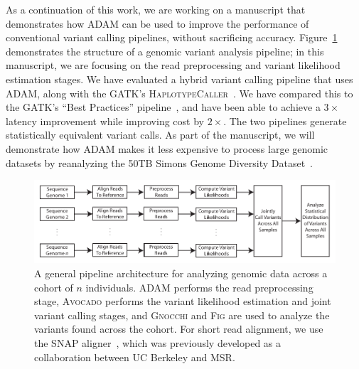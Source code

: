 \documentclass[11pt]{article} %
\begin{document}
As a continuation of this work, we are working on a manuscript that demonstrates how \textsc{ADAM}
can be used to improve the performance of conventional variant calling pipelines, without
sacrificing accuracy. Figure~\ref{fig:pipeline} demonstrates the structure of a genomic variant
analysis pipeline; in this manuscript, we are focusing on the read preprocessing and variant
likelihood estimation stages. We have evaluated a hybrid variant calling pipeline that
uses \textsc{ADAM}, along with the \textsc{GATK}'s \textsc{HaplotypeCaller}~\cite{depristo11}. We
have compared this to the \textsc{GATK}'s ``Best Practices'' pipeline~\cite{auwera13}, and have
been able to achieve a $3\times$ latency improvement while improving cost by $2\times$. The
two pipelines generate statistically equivalent variant calls. As part of the manuscript, we
will demonstrate how \textsc{ADAM} makes it less expensive to process large genomic datasets
by reanalyzing the 50TB Simons Genome Diversity Dataset~\cite{simons}.

\begin{figure}[h]
\begin{center}
\includegraphics[width=0.85\linewidth]{pipeline.pdf}
\caption{A general pipeline architecture for analyzing genomic data across a cohort of
$n$ individuals. \textsc{ADAM} performs the read preprocessing stage, \textsc{Avocado}
performs the variant likelihood estimation and joint variant calling stages, and
\textsc{Gnocchi} and \textsc{Fig} are used to analyze the variants found across the cohort.
For short read alignment, we use the \textsc{SNAP} aligner~\cite{zaharia11}, which was
previously developed as a collaboration between UC Berkeley and MSR.}
\label{fig:pipeline}
\end{center}
\end{figure}
\end{document}
